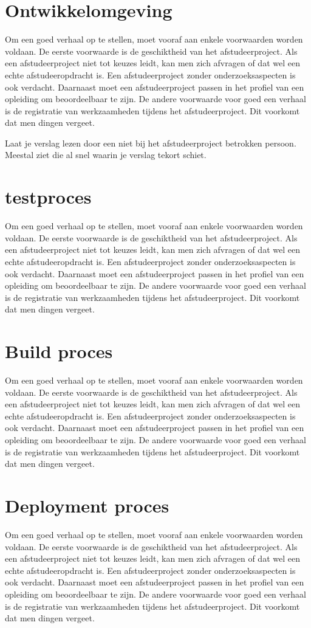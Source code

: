 		\section{Ontwikkelomgeving}
		Om een goed verhaal op te stellen, moet vooraf aan enkele voorwaarden
		worden voldaan. De eerste voorwaarde is de geschiktheid van het
		afstudeerproject. Als een afstudeerproject niet tot keuzes leidt, kan
		men zich afvragen of dat wel een echte afstudeeropdracht is. Een
		afstudeerproject zonder onderzoeksaspecten is ook verdacht. Daarnaast
		moet een afstudeerproject passen in het profiel van een opleiding om
		beoordeelbaar te zijn. De andere voorwaarde voor goed een verhaal is
		de registratie van werkzaamheden tijdens het afstudeerproject. Dit
		voorkomt dat men dingen vergeet.
		
		
		Laat je verslag lezen door een niet bij het afstudeerproject betrokken
		persoon. Meestal ziet die al snel waarin je verslag tekort schiet.
		\section{testproces}
		Om een goed verhaal op te stellen, moet vooraf aan enkele voorwaarden
		worden voldaan. De eerste voorwaarde is de geschiktheid van het
		afstudeerproject. Als een afstudeerproject niet tot keuzes leidt, kan
		men zich afvragen of dat wel een echte afstudeeropdracht is. Een
		afstudeerproject zonder onderzoeksaspecten is ook verdacht. Daarnaast
		moet een afstudeerproject passen in het profiel van een opleiding om
		beoordeelbaar te zijn. De andere voorwaarde voor goed een verhaal is
		de registratie van werkzaamheden tijdens het afstudeerproject. Dit
		voorkomt dat men dingen vergeet.
		\section{Build proces}
		Om een goed verhaal op te stellen, moet vooraf aan enkele voorwaarden
		worden voldaan. De eerste voorwaarde is de geschiktheid van het
		afstudeerproject. Als een afstudeerproject niet tot keuzes leidt, kan
		men zich afvragen of dat wel een echte afstudeeropdracht is. Een
		afstudeerproject zonder onderzoeksaspecten is ook verdacht. Daarnaast
		moet een afstudeerproject passen in het profiel van een opleiding om
		beoordeelbaar te zijn. De andere voorwaarde voor goed een verhaal is
		de registratie van werkzaamheden tijdens het afstudeerproject. Dit
		voorkomt dat men dingen vergeet.
		\section{Deployment proces}
		Om een goed verhaal op te stellen, moet vooraf aan enkele voorwaarden
		worden voldaan. De eerste voorwaarde is de geschiktheid van het
		afstudeerproject. Als een afstudeerproject niet tot keuzes leidt, kan
		men zich afvragen of dat wel een echte afstudeeropdracht is. Een
		afstudeerproject zonder onderzoeksaspecten is ook verdacht. Daarnaast
		moet een afstudeerproject passen in het profiel van een opleiding om
		beoordeelbaar te zijn. De andere voorwaarde voor goed een verhaal is
		de registratie van werkzaamheden tijdens het afstudeerproject. Dit
		voorkomt dat men dingen vergeet.
